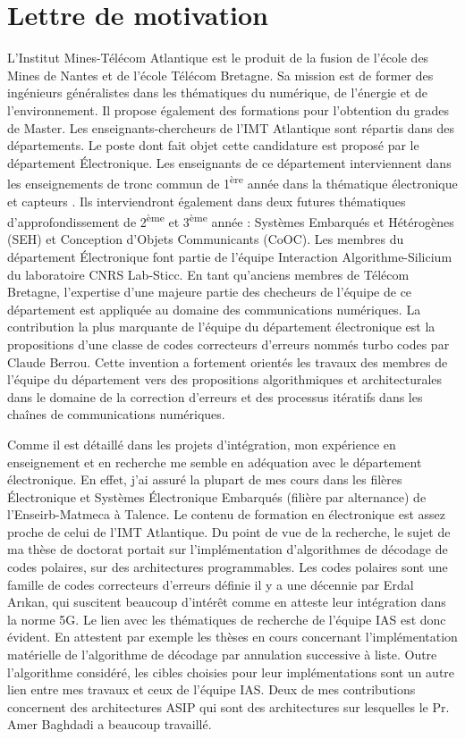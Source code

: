 \section{Lettre de motivation}

L'Institut Mines-Télécom Atlantique est le produit de la fusion de l'école des Mines de Nantes et de l'école Télécom Bretagne. 
Sa mission est de former des ingénieurs généralistes dans les thématiques du numérique, de l'énergie et de l'environnement.
Il propose également des formations pour l'obtention du grades de Master.
Les enseignants-chercheurs de l'IMT Atlantique sont répartis dans des départements.
Le poste dont fait objet cette candidature est proposé par le département \'Electronique.
Les enseignants de ce département interviennent dans les enseignements de tronc commun de 1\textsuperscript{ère} année dans la thématique \og électronique et capteurs \fg{}.
Ils interviendront également dans deux futures thématiques d'approfondissement de 2\textsuperscript{ème} et 3\textsuperscript{ème} année : Systèmes Embarqués et Hétérogènes (SEH) et Conception d'Objets Communicants (CoOC).
Les membres du département \'Electronique font partie de l'équipe \og Interaction Algorithme-Silicium \fg du laboratoire CNRS Lab-Sticc.
En tant qu'anciens membres de Télécom Bretagne, l'expertise d'une majeure partie des checheurs de l'équipe de ce département est appliquée au domaine des communications numériques. 
La contribution la plus marquante de l'équipe du département électronique est la propositions d'une classe de codes correcteurs d'erreurs nommés turbo codes par Claude Berrou. 
Cette invention a fortement orientés les travaux des membres de l'équipe du département vers des propositions algorithmiques et architecturales dans le domaine de la correction d'erreurs et des processus itératifs dans les chaînes de communications numériques.

Comme il est détaillé dans les projets d'intégration, mon expérience en enseignement et en recherche me semble en adéquation avec le département électronique.
En effet, j'ai assuré la plupart de mes cours dans les filères \'Electronique et Systèmes \'Electronique Embarqués (filière par alternance) de l'Enseirb-Matmeca à Talence. Le contenu de formation en électronique est assez proche de celui de l'IMT Atlantique.
Du point de vue de la recherche, le sujet de ma thèse de doctorat portait sur l'implémentation d'algorithmes de décodage de codes polaires, sur des architectures programmables. Les codes polaires sont une famille de codes correcteurs d'erreurs définie il y a une décennie par Erdal Ar\i{}kan, qui suscitent beaucoup d'intérêt comme en atteste leur intégration dans la norme 5G. Le lien avec les thématiques de recherche de l'équipe IAS est donc évident. En attestent par exemple les thèses en cours concernant l'implémentation matérielle de l'algorithme de décodage par annulation successive à liste. Outre l'algorithme considéré, les cibles choisies pour leur implémentations sont un autre lien entre mes travaux et ceux de l'équipe IAS. Deux de mes contributions concernent des architectures ASIP qui sont des architectures sur lesquelles le Pr. Amer Baghdadi a beaucoup travaillé.

